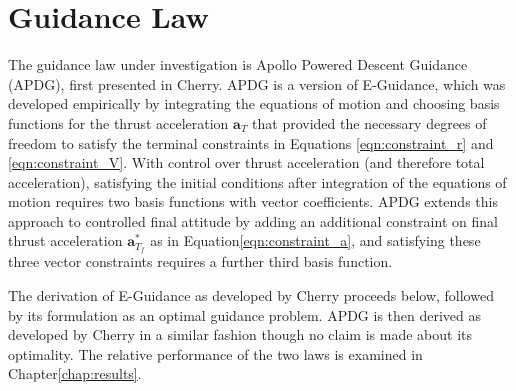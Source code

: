 \section{Guidance Law} \label{sec:guidancelaw}
The guidance law under investigation is Apollo Powered Descent Guidance (APDG), first presented in Cherry\:\cite{CHERRY}. APDG is a version of E-Guidance, which was developed empirically by integrating the equations of motion and choosing basis functions for the thrust acceleration $\bm{a}_T$ that provided the necessary degrees of freedom to satisfy the terminal constraints in Equations \ref{eqn:constraint_r} and \ref{eqn:constraint_V}. With control over thrust acceleration (and therefore total acceleration), satisfying the initial conditions after integration of the equations of motion requires two basis functions with vector coefficients. APDG extends this approach to controlled final attitude by adding an additional constraint on final thrust acceleration $\bm{a}^*_{T_f}$ as in Equation\:\ref{eqn:constraint_a}, and satisfying these three vector constraints requires a further third basis function. 

The derivation of E-Guidance as developed by Cherry proceeds below, followed by its formulation as an optimal guidance problem. APDG is then derived as developed by Cherry in a similar fashion though no claim is made about its optimality. The relative performance of the two laws is examined in Chapter\:\ref{chap:results}.

%
%
%
%
%
%

